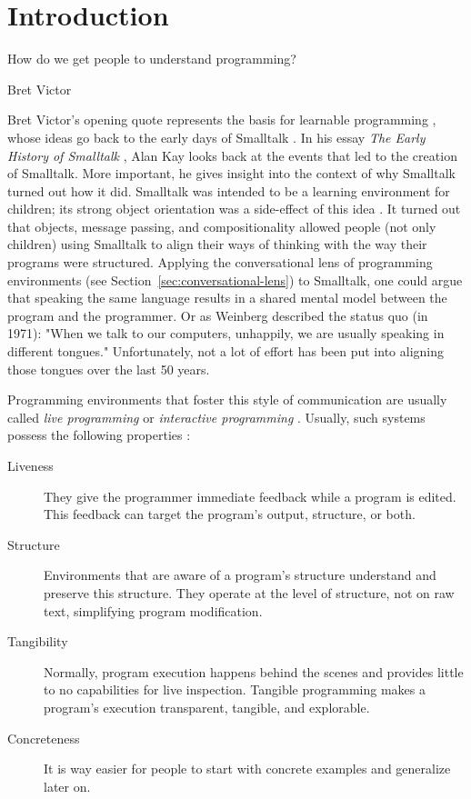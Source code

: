 \chapter{Introduction}
\label{cha:introduction}
\epigraph{How do we get people to understand programming?}{Bret Victor}

Bret Victor's opening quote represents the basis for learnable programming \cite{victor_learnable_2012}, whose ideas go back to the early days of Smalltalk \cite{kay_early_1993}.
In his essay \emph{The Early History of Smalltalk} \cite{kay_early_1993}, Alan Kay looks back at the events that led to the creation of Smalltalk.
More important, he gives insight into the context of why Smalltalk turned out how it did.
Smalltalk was intended to be a learning environment for children; its strong object orientation was a side-effect of this idea \cite{kay_early_1993}.
It turned out that objects, message passing, and compositionality allowed people (not only children) using Smalltalk to align their ways of thinking with the way their programs were structured.
Applying the conversational lens of programming environments (see Section~\ref{sec:conversational-lens}) to Smalltalk, one could argue that speaking the same language results in a shared mental model between the program and the programmer.
Or as Weinberg described the status quo (in 1971): "When we talk to our computers, unhappily, we are usually speaking in different tongues." \cite{weinberg_psychology_1971}
Unfortunately, not a lot of effort has been put into aligning those tongues over the last 50 years.

Programming environments that foster this style of communication are usually called \emph{live programming} \cite{aguiar_live_2019, church_liveness_2010} or \emph{interactive programming} \cite{czaplicki_interactive_2013, mccabe_towards_2023}.
Usually, such systems possess the following properties \cite{burg_1st_2013}:
\begin{description}
    \item[Liveness] They give the programmer immediate feedback while a program is edited. This feedback can target the program's output, structure, or both.
    \item[Structure] Environments that are aware of a program's structure understand and preserve this structure. They operate at the level of structure, not on raw text, simplifying program modification.
    \item[Tangibility] Normally, program execution happens behind the scenes and provides little to no capabilities for live inspection. Tangible programming makes a program's execution transparent, tangible, and explorable.
    \item[Concreteness] It is way easier for people to start with concrete examples and generalize later on.
\end{description}

